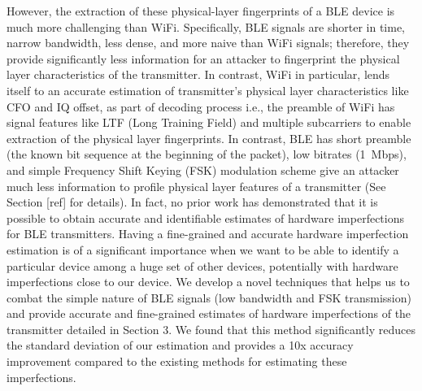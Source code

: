 However, the extraction of these physical-layer fingerprints of a BLE device is much more 
challenging than WiFi.
%
Specifically, BLE signals are shorter in time, narrow bandwidth, less dense, and more naive than WiFi signals; therefore, they provide significantly less information for an attacker to fingerprint the physical layer characteristics of the transmitter.
%
In contrast, WiFi in particular, lends itself to an accurate estimation of transmitter's physical layer characteristics like CFO and IQ offset, as part of decoding process i.e., the preamble of WiFi has signal features like LTF (Long Training Field) and multiple subcarriers to enable extraction of the physical layer fingerprints.
In contrast, BLE has short preamble (the known bit sequence at the beginning of the
packet), low bitrates (1~Mbps), and simple
Frequency Shift Keying (FSK) modulation scheme give an attacker much less information to profile 
physical layer features of a transmitter (See Section [ref] for details). In fact, no prior work
 has demonstrated that it is possible to obtain accurate and identifiable estimates of hardware
  imperfections for BLE transmitters. Having a fine-grained and accurate hardware imperfection 
  estimation is of a significant importance when we want to be able to identify a particular 
  device among a huge set of other devices, potentially with hardware imperfections close to our device. 
We develop a novel techniques that helps us to combat the simple nature of BLE signals (low bandwidth and FSK transmission) and provide accurate and fine-grained estimates of hardware imperfections of the transmitter detailed in Section 3. We found that this method significantly reduces the standard deviation of our estimation and provides a 10x accuracy improvement compared to the existing methods for estimating these imperfections.



